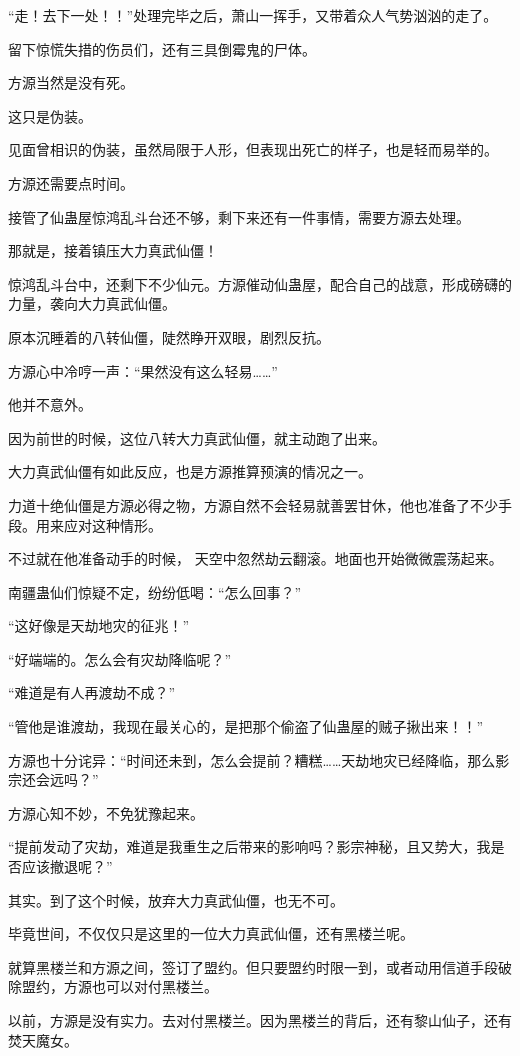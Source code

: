 \begin{this_body}
“走！去下一处！！”处理完毕之后，萧山一挥手，又带着众人气势汹汹的走了。

留下惊慌失措的伤员们，还有三具倒霉鬼的尸体。

方源当然是没有死。

这只是伪装。

见面曾相识的伪装，虽然局限于人形，但表现出死亡的样子，也是轻而易举的。

方源还需要点时间。

接管了仙蛊屋惊鸿乱斗台还不够，剩下来还有一件事情，需要方源去处理。

那就是，接着镇压大力真武仙僵！

惊鸿乱斗台中，还剩下不少仙元。方源催动仙蛊屋，配合自己的战意，形成磅礴的力量，袭向大力真武仙僵。

原本沉睡着的八转仙僵，陡然睁开双眼，剧烈反抗。

方源心中冷哼一声：“果然没有这么轻易……”

他并不意外。

因为前世的时候，这位八转大力真武仙僵，就主动跑了出来。

大力真武仙僵有如此反应，也是方源推算预演的情况之一。

力道十绝仙僵是方源必得之物，方源自然不会轻易就善罢甘休，他也准备了不少手段。用来应对这种情形。

不过就在他准备动手的时候， 天空中忽然劫云翻滚。地面也开始微微震荡起来。

南疆蛊仙们惊疑不定，纷纷低喝：“怎么回事？”

“这好像是天劫地灾的征兆！”

“好端端的。怎么会有灾劫降临呢？”

“难道是有人再渡劫不成？”

“管他是谁渡劫，我现在最关心的，是把那个偷盗了仙蛊屋的贼子揪出来！！”

方源也十分诧异：“时间还未到，怎么会提前？糟糕……天劫地灾已经降临，那么影宗还会远吗？”

方源心知不妙，不免犹豫起来。

“提前发动了灾劫，难道是我重生之后带来的影响吗？影宗神秘，且又势大，我是否应该撤退呢？”

其实。到了这个时候，放弃大力真武仙僵，也无不可。

毕竟世间，不仅仅只是这里的一位大力真武仙僵，还有黑楼兰呢。

就算黑楼兰和方源之间，签订了盟约。但只要盟约时限一到，或者动用信道手段破除盟约，方源也可以对付黑楼兰。

以前，方源是没有实力。去对付黑楼兰。因为黑楼兰的背后，还有黎山仙子，还有焚天魔女。


\end{this_body}
